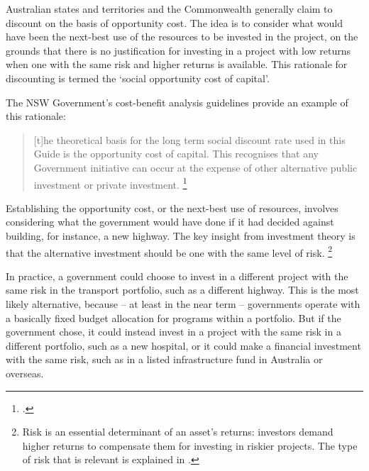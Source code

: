 \documentclass{grattan}
\begin{document}
Australian states and territories and the Commonwealth generally claim to discount on the basis of opportunity cost. The idea is to consider what would have been the next-best use of the resources to be invested in the project, on the grounds that there is no justification for investing in a project with low returns when one with the same risk and higher returns is available. This rationale for discounting is termed the `social opportunity cost of capital'.

The NSW Government's cost-benefit analysis guidelines provide an example of this rationale:
\begin{quote}\small[t]he theoretical basis for the long term social discount rate used in this Guide is the opportunity cost of capital. This recognises that any Government initiative can occur at the expense of other alternative public investment or private investment.%
    \footcite[][iii]{New-South-Wales-Treasury-2017-CBA-Guidelines}
\end{quote}

Establishing the opportunity cost, or the next-best use of resources, involves considering what the government would have done if it had decided against building, for instance, a new highway. The key insight from investment theory is that the alternative investment should be one with the same level of risk.%
    \footnote{Risk is an essential determinant of an asset’s returns: investors demand higher returns to compensate them for investing in riskier projects. The type of risk that is relevant is explained in .}

In practice, a government could choose to invest in a different project with the same risk in the transport portfolio, such as a different highway. This is the most likely alternative, because – at least in the near term – governments operate with a basically fixed budget allocation for programs within a portfolio. But if the government chose, it could instead invest in a project with the same risk in a different portfolio, such as a new hospital, or it could make a financial investment with the same risk, such as in a listed infrastructure fund in Australia or overseas.%
\end{document}
